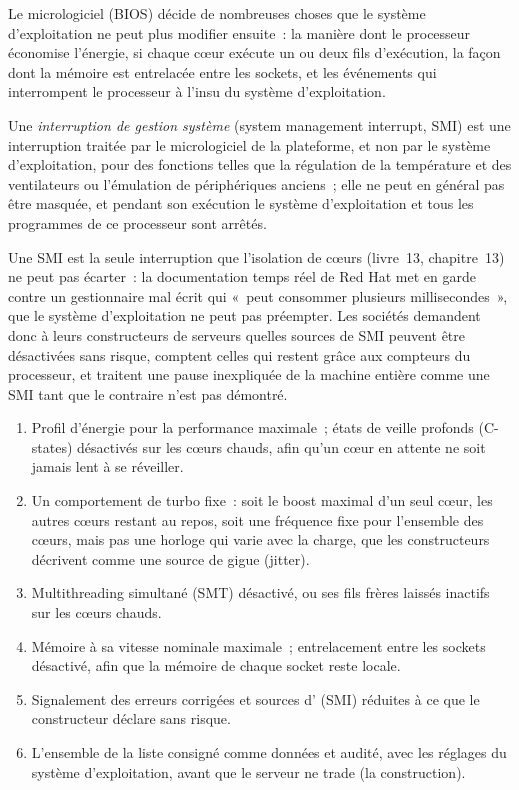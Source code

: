 Le micrologiciel (BIOS) décide de nombreuses choses que le système d'exploitation ne peut plus modifier ensuite~: la manière dont le processeur économise l'énergie, si chaque
cœur exécute un ou deux fils d'exécution, la façon dont la mémoire est entrelacée entre les sockets, et les événements qui interrompent le processeur à l'insu du
système d'exploitation.

\begin{definition}\label{def:nw:servers:smi}
Une \emph{interruption de gestion système} (system management interrupt, SMI) est une interruption traitée par le micrologiciel de la plateforme, et non par le
système d'exploitation, pour des fonctions telles que la régulation de la température et des ventilateurs ou l'émulation de périphériques anciens~; elle ne peut en général pas être masquée,
et pendant son exécution le système d'exploitation et tous les programmes de ce processeur sont arrêtés.
\end{definition}

Une SMI est la seule interruption que l'isolation de cœurs (livre~13, chapitre~13) ne peut pas écarter~: la documentation temps réel de Red Hat met en garde
contre un gestionnaire mal écrit qui «~peut consommer plusieurs millisecondes~», que le système d'exploitation ne peut pas préempter. Les sociétés demandent donc à leurs
constructeurs de serveurs quelles sources de SMI peuvent être désactivées sans risque, comptent celles qui restent grâce aux compteurs du processeur, et traitent une
pause inexpliquée de la machine entière comme une SMI tant que le contraire n'est pas démontré.

\begin{method}\label{met:nw:servers:bios}
\begin{enumerate}
\item Profil d'énergie pour la performance maximale~; états de veille profonds (C-states) désactivés sur les cœurs chauds, afin qu'un cœur en attente ne soit jamais lent à se réveiller.
\item Un comportement de turbo fixe~: soit le boost maximal d'un seul cœur, les autres cœurs restant au repos, soit une fréquence fixe pour l'ensemble des cœurs, mais
  pas une horloge qui varie avec la charge, que les constructeurs décrivent comme une source de gigue (jitter).
\item Multithreading simultané (SMT) désactivé, ou ses fils frères laissés inactifs sur les cœurs chauds.
\item Mémoire à sa vitesse nominale maximale~; entrelacement entre les sockets désactivé, afin que la mémoire de chaque socket reste locale.
\item Signalement des erreurs corrigées et sources d' (SMI) réduites à ce que le constructeur déclare sans risque.
\item L'ensemble de la liste consigné comme données et audité, avec les réglages du système d'exploitation, avant que le serveur ne trade (la construction).
\end{enumerate}
\end{method}

